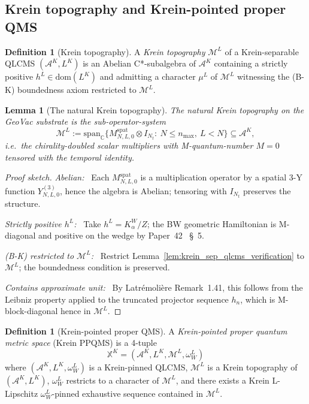\documentclass[11pt,a4paper]{article}
\theoremstyle{plain}
\newtheorem{lemma}[theorem]{Lemma}
\theoremstyle{definition}
\newtheorem{definition}[theorem]{Definition}
\newcommand{\nmax}{n_{\max}}
\newcommand{\Nt}{N_{t}}
\newcommand{\Acal}{\mathcal{A}}
\newcommand{\Mcal}{\mathcal{M}}
\newcommand{\C}{\mathbb{C}}
\newcommand{\spat}{\mathrm{spat}}
\newcommand{\BWvac}{\omega_{W}^{L}}
\newcommand{\Kalpha}{K_{\alpha}^{W}}
\begin{document}
\subsection{Krein topography and Krein-pointed proper
QMS}\label{sec:krein_topography}

\begin{definition}[Krein topography]\label{def:krein_topography}
A \emph{Krein topography} $\Mcal^{L}$ of a Krein-separable QLCMS
$(\Acal^{K}, L^{K})$ is an Abelian C*-subalgebra of $\Acal^{K}$
containing a strictly positive $h^{L} \in \mathrm{dom}(L^{K})$ and
admitting a character $\mu^{L}$ of $\Mcal^{L}$ witnessing the (B-K)
boundedness axiom restricted to $\Mcal^{L}$.
\end{definition}

\begin{lemma}[The natural Krein topography]\label{lem:natural_krein_topography}
The natural Krein topography on the GeoVac substrate is the
sub-operator-system
\[
\Mcal^{L} := \mathrm{span}_{\C}\bigl\{
M^{\spat}_{N, L, 0} \otimes I_{\Nt} :\ N \le \nmax,\ L < N
\bigr\}
\subseteq \Acal^{K},
\]
i.e.\ the chirality-doubled scalar multipliers with M-quantum-number
$M = 0$ tensored with the temporal identity.
\end{lemma}

\begin{proof}[Proof sketch]
\emph{Abelian:\ } Each $M^{\spat}_{N, L, 0}$ is a multiplication
operator by a spatial 3-Y function $Y^{(3)}_{N, L, 0}$, hence the
algebra is Abelian; tensoring with $I_{\Nt}$ preserves the structure.

\emph{Strictly positive $h^{L}$:\ } Take $h^{L} = \Kalpha/Z$; the BW
geometric Hamiltonian is M-diagonal and positive on the wedge by
Paper~42~\cite{paper42} \S~5.

\emph{(B-K) restricted to $\Mcal^{L}$:\ } Restrict
Lemma~\ref{lem:krein_sep_qlcms_verification} to $\Mcal^{L}$; the
boundedness condition is preserved.

\emph{Contains approximate unit:\ } By Latr\'emoli\`ere Remark~1.41,
this follows from the Leibniz property applied to the truncated
projector sequence $h_{n}$, which is M-block-diagonal hence in
$\Mcal^{L}$.
\end{proof}

\begin{definition}[Krein-pointed proper QMS]\label{def:krein_ppqms}
A \emph{Krein-pointed proper quantum metric space} (Krein PPQMS) is
a 4-tuple
\[
\mathbb{X}^{K} = (\Acal^{K}, L^{K}, \Mcal^{L}, \BWvac)
\]
where $(\Acal^{K}, L^{K}, \BWvac)$ is a Krein-pinned QLCMS,
$\Mcal^{L}$ is a Krein topography of $(\Acal^{K}, L^{K})$, $\BWvac$
restricts to a character of $\Mcal^{L}$, and there exists a Krein
L-Lipschitz $\BWvac$-pinned exhaustive sequence contained in
$\Mcal^{L}$.
\end{definition}
\end{document}
